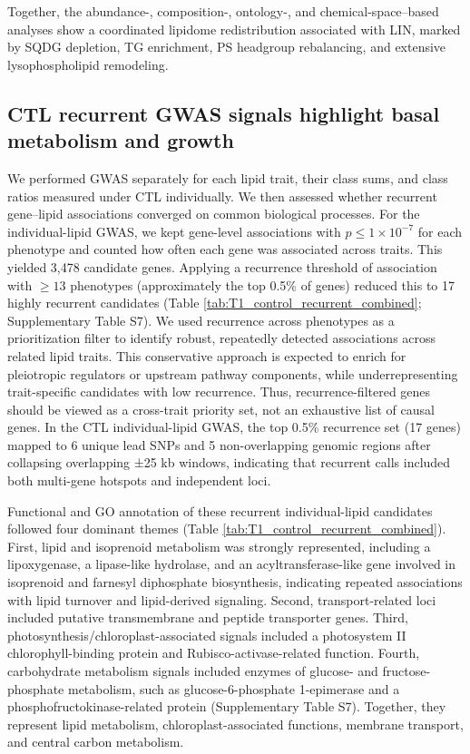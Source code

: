 \documentclass[9pt,twocolumn,twoside]{rilabRxiv}
\begin{document}
Together, the abundance-, composition-, ontology-, and chemical-space–based analyses show a coordinated lipidome redistribution associated with LIN, marked by SQDG depletion, TG enrichment, PS headgroup rebalancing, and extensive lysophospholipid remodeling.

\subsection*{CTL recurrent GWAS signals highlight basal metabolism and growth}

We performed GWAS separately for each lipid trait, their class sums, and class ratios measured under CTL individually. We then assessed whether recurrent gene--lipid associations converged on common biological processes. For the individual-lipid GWAS, we kept gene-level associations with $p \le 1 \times 10^{-7}$ for each phenotype and counted how often each gene was associated across traits. This yielded 3,478 candidate genes. Applying a recurrence threshold of association with $\geq 13$ phenotypes (approximately the top 0.5\% of genes) reduced this to 17 highly recurrent candidates (Table \ref{tab:T1_control_recurrent_combined}; Supplementary Table S7). We used recurrence across phenotypes as a prioritization filter to identify robust, repeatedly detected associations across related lipid traits. This conservative approach is expected to enrich for pleiotropic regulators or upstream pathway components, while underrepresenting trait-specific candidates with low recurrence. Thus, recurrence-filtered genes should be viewed as a cross-trait priority set, not an exhaustive list of causal genes. In the CTL individual-lipid GWAS, the top 0.5\% recurrence set (17 genes) mapped to 6 unique lead SNPs and 5 non-overlapping genomic regions after collapsing overlapping ±25 kb windows, indicating that recurrent calls included both multi-gene hotspots and independent loci.

Functional and GO annotation of these recurrent individual-lipid candidates followed four dominant themes (Table \ref{tab:T1_control_recurrent_combined}). First, lipid and isoprenoid metabolism was strongly represented, including a lipoxygenase, a lipase-like hydrolase, and an acyltransferase-like gene involved in isoprenoid and farnesyl diphosphate biosynthesis, indicating repeated associations with lipid turnover and lipid-derived signaling. Second, transport-related loci included putative transmembrane and peptide transporter genes. Third, photosynthesis/chloroplast-associated signals included a photosystem II chlorophyll-binding protein and Rubisco-activase-related function. Fourth, carbohydrate metabolism signals included enzymes of glucose- and fructose-phosphate metabolism, such as glucose-6-phosphate 1-epimerase and a phosphofructokinase-related protein \citep{GeneOntologyConsortium2026} (Supplementary Table S7). Together, they represent lipid metabolism, chloroplast-associated functions, membrane transport, and central carbon metabolism.
\end{document}
